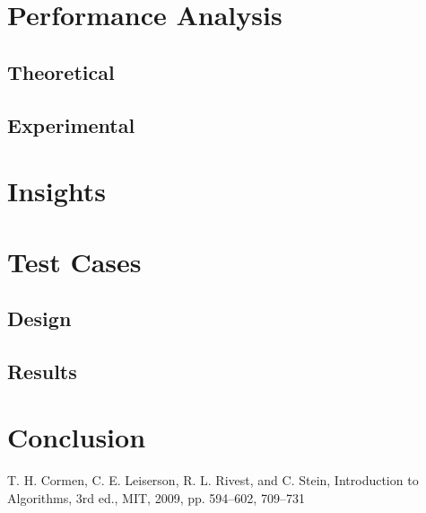 \documentclass[conference]{IEEEtran}
\begin{document}
\section{Performance Analysis}
\subsection{Theoretical}
\subsection{Experimental}

\section{Insights}

\section{Test Cases}
\subsection{Design}
\subsection{Results}

\section{Conclusion}

\begin{thebibliography}{00}
     T. H. Cormen, C. E. Leiserson, R. L. Rivest, and C. Stein, Introduction to Algorithms, 3rd ed., MIT, 2009, pp. 594--602, 709--731 
\end{thebibliography}
\end{document}
